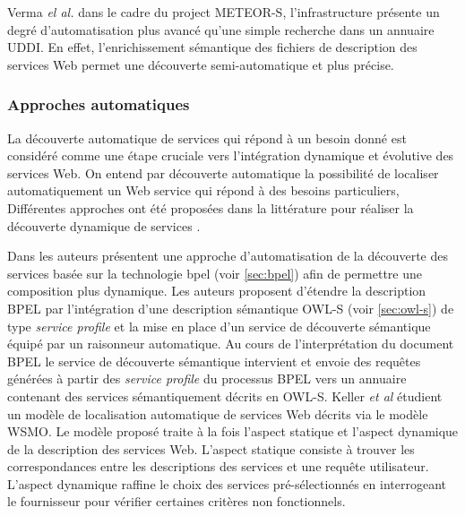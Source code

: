     Verma \textit{el al.} \cite{verma2005meteor} dans le cadre du
    project \textsc{METEOR-S}, l'infrastructure présente un degré
    d'automatisation plus avancé qu'une simple recherche dans un
    annuaire \textsc{UDDI}. En effet, l'enrichissement sémantique des
    fichiers de description des services Web permet une découverte
    semi-automatique et plus précise.

    \subsubsection{Approches automatiques}
    \label{ws-desc:auto}

    La découverte automatique de services qui répond à un besoin donné
    est considéré comme une étape cruciale vers l'intégration
    dynamique et évolutive des services Web. On entend par découverte
    automatique la possibilité de localiser automatiquement un Web
    service qui répond à des besoins particuliers, Différentes
    approches ont été proposées dans la littérature pour réaliser la
    découverte dynamique de services \cite{paolucci2002semantic,
      bernstein2002discovering, mandell2003bottom,
      benatallah2005automating,keller2005automatic}.

    Dans \cite{mandell2003bottom} les auteurs présentent une approche
    d'automatisation de la découverte des services basée sur la
    technologie \acrshort{bpel} (voir \ref{sec:bpel}) afin de
    permettre une composition plus dynamique. Les auteurs proposent
    d'étendre la description \textsc{BPEL} par l'intégration d'une
    description sémantique \textsc{OWL-S} (voir \ref{sec:owl-s}) de
    type \textit{service profile} et la mise en place d'un service de
    découverte sémantique équipé par un raisonneur automatique. Au
    cours de l'interprétation du document \textsc{BPEL} le service de
    découverte sémantique intervient et envoie des requêtes générées à
    partir des \textit{service profile} du processus \textsc{ BPEL}
    vers un annuaire contenant des services sémantiquement décrits en
    \textsc{OWL-S}.
    Keller \textit{et al} \cite{keller2005automatic} étudient un
    modèle de localisation automatique de services Web décrits via le
    modèle \textsc{WSMO}. Le modèle proposé traite à la fois l'aspect
    statique et l'aspect dynamique de la description des services
    Web. L'aspect statique consiste à trouver les correspondances
    entre les descriptions des services et une requête
    utilisateur. L'aspect dynamique raffine le choix des services
    pré-sélectionnés en interrogeant le fournisseur pour vérifier
    certaines critères non fonctionnels.

